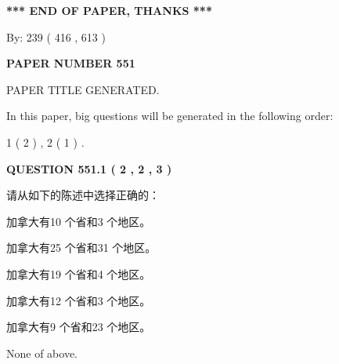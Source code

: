 \documentclass{ctexart}
\begin{document}
   
   
   
\vspace{1.0in} 
{\textbf{\large{ *** END OF PAPER, THANKS *** }}} 
   
   
\hspace{1.0in} By: 
 239 ( 416 ,  613 )
   
   
   
   
\newpage 
\setcounter{page}{ 
   551001 } 
   
   
   
   
 {\textbf{ \Large{ PAPER NUMBER  551  }}}
   
   
\vspace{0.2in}
   
   
   
   
   
   
   
   
 \vspace{0.2in}
 
 
 
 
   
   
 PAPER TITLE GENERATED.
   
   
   
\vspace{0.2in}
   
In this paper, big questions will be generated in the following order: 
   
   
   1 ( 2 )
 ,
   2 ( 1 )
 .
  
\vspace{0.2in}
  
{\textbf{\Large{QUESTION
551.1 
 ( 2 , 2 , 3 )
}}}
  
  
请从如下的陈述中选择正确的：
 
 
加拿大有10 个省和3 个地区。
 
 
加拿大有25 个省和31 个地区。
 
 
加拿大有19 个省和4 个地区。
 
 
加拿大有12 个省和3 个地区。
 
 
加拿大有9 个省和23 个地区。
 
 
 None of above.
 
 
\noindent{}
 
\end{document}
